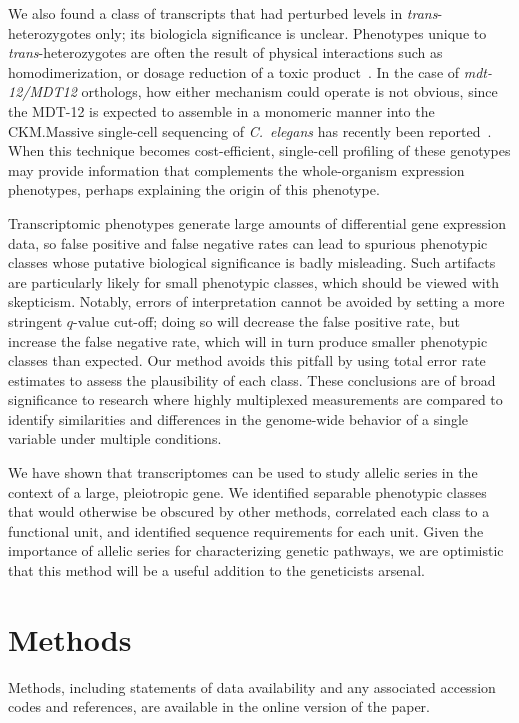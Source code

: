 \documentclass[8pt, twocolumn]{article}
\newcommand{\cel}{\emph{C.~elegans}}
\newcommand{\gene}[1]{\mbox{\emph{#1}}}
\newcommand{\protein}[1]{\mbox{\uppercase{#1}}}
\newcommand{\dpy}[1]{\gene{mdt-12#1}}
\begin{document}
We also found a class of transcripts that had perturbed levels in
\emph{trans}-heterozygotes only; its biologicla significance is unclear.
Phenotypes unique to \emph{trans}-heterozygotes are often the result of physical
interactions such as homodimerization, or dosage reduction of a toxic
product~\cite{Yook2005}. In the case of \dpy{/MDT12} orthologs, how either mechanism
could operate is not obvious, since the \protein{mdt-12} is expected to assemble
in a monomeric manner into the CKM.\@ Massive single-cell sequencing of \cel{}
has recently been reported~\cite{Cao2017}. When this technique becomes
cost-efficient, single-cell profiling of these genotypes may provide information
that complements the whole-organism expression phenotypes, perhaps explaining
the origin of this phenotype.

Transcriptomic phenotypes generate large amounts of differential gene expression
data, so false positive and false negative rates can lead to spurious phenotypic
classes whose putative biological significance is badly misleading. Such
artifacts are particularly likely for small phenotypic classes, which should be
viewed with skepticism. Notably, errors of interpretation cannot be avoided by
setting a more stringent $q$-value cut-off; doing so will decrease the
false positive rate, but increase the false negative rate, which will in turn
produce smaller phenotypic classes than expected. Our method avoids this pitfall
by using total error rate estimates to assess the plausibility
of each class. These conclusions are of broad significance to research where
highly multiplexed measurements are compared to identify similarities and
differences in the genome-wide behavior of a single variable under multiple
conditions.

We have shown that transcriptomes can be used to study allelic series in the
context of a large, pleiotropic gene. We identified separable phenotypic classes
that would otherwise be obscured by other methods, correlated
each class to a functional unit, and identified sequence requirements for each
unit. Given the importance of allelic series for characterizing genetic
pathways, we are optimistic that this method will be a useful addition to the
geneticists arsenal.


\section*{Methods}
\label{sec:methods}
Methods, including statements of data availability and any associated
accession codes and references, are available in the online version of
the paper.
\end{document}

